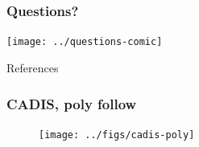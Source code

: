 \documentclass[xcolor=x11names,compress, handout]{beamer}
\renewcommand{\(}{\begin{columns}}
\renewcommand{\)}{\end{columns}}
\newcommand{\<}[1]{\begin{column}{#1}}
\renewcommand{\>}{\end{column}}
\begin{document}
\section*{}
\begin{frame}[fragile]
  \frametitle{Questions?}
  \begin{center}
  \texttt{[image: ../questions-comic]}  
  \end{center}
  
\end{frame}

\begin{frame}[allowframebreaks]{References}
	
	
\end{frame}


\begin{frame}[fragile]
  \frametitle{CADIS, poly follow}
 \begin{figure}[p]
   \begin{center}
     \texttt{[image: ../figs/cadis-poly]}
   \end{center}
 \end{figure}
\end{frame}
\end{document}
